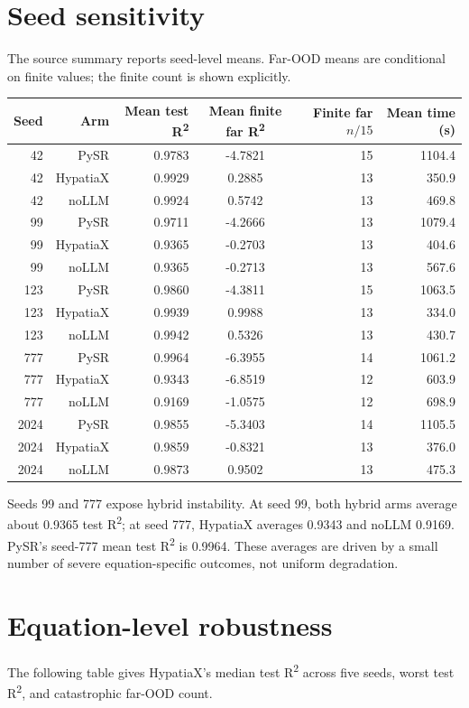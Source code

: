\documentclass[11pt,a4paper]{article}
\begin{document}
\section{Seed sensitivity}
The source summary reports seed-level means. Far-OOD means are conditional on finite values; the finite count is shown explicitly.

\begin{center}
\small
\begin{tabular}{rrrcrr}
\toprule
Seed & Arm & Mean test R\textsuperscript{2} & Mean finite far R\textsuperscript{2} & Finite far $n/15$ & Mean time (s)\\
\midrule
42 & PySR & 0.9783 & -4.7821 & 15 & 1104.4\\
42 & HypatiaX & 0.9929 & 0.2885 & 13 & 350.9\\
42 & noLLM & 0.9924 & 0.5742 & 13 & 469.8\\
99 & PySR & 0.9711 & -4.2666 & 13 & 1079.4\\
99 & HypatiaX & 0.9365 & -0.2703 & 13 & 404.6\\
99 & noLLM & 0.9365 & -0.2713 & 13 & 567.6\\
123 & PySR & 0.9860 & -4.3811 & 15 & 1063.5\\
123 & HypatiaX & 0.9939 & 0.9988 & 13 & 334.0\\
123 & noLLM & 0.9942 & 0.5326 & 13 & 430.7\\
777 & PySR & 0.9964 & -6.3955 & 14 & 1061.2\\
777 & HypatiaX & 0.9343 & -6.8519 & 12 & 603.9\\
777 & noLLM & 0.9169 & -1.0575 & 12 & 698.9\\
2024 & PySR & 0.9855 & -5.3403 & 14 & 1105.5\\
2024 & HypatiaX & 0.9859 & -0.8321 & 13 & 376.0\\
2024 & noLLM & 0.9873 & 0.9502 & 13 & 475.3\\
\bottomrule
\end{tabular}
\end{center}

Seeds 99 and 777 expose hybrid instability. At seed 99, both hybrid arms average about 0.9365 test R\textsuperscript{2}; at seed 777, HypatiaX averages 0.9343 and noLLM 0.9169. PySR's seed-777 mean test R\textsuperscript{2} is 0.9964. These averages are driven by a small number of severe equation-specific outcomes, not uniform degradation.

\section{Equation-level robustness}
The following table gives HypatiaX's median test R\textsuperscript{2} across five seeds, worst test R\textsuperscript{2}, and catastrophic far-OOD count.
\end{document}
